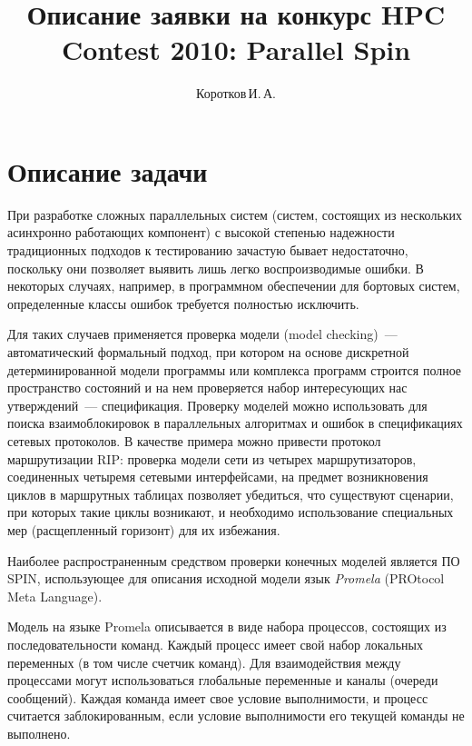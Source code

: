 \documentclass[12pt,a4paper,fleqn]{article}
\title{Описание заявки на конкурс HPC Contest 2010: Parallel Spin}
\author{Коротков\,И.\,А.}
\begin{document}

\section{Описание задачи}

При разработке сложных параллельных систем (систем, состоящих из нескольких асинхронно
работающих компонент) с высокой степенью надежности традиционных подходов к тестированию
зачастую бывает недостаточно, поскольку они позволяет выявить лишь легко воспроизводимые
ошибки. В некоторых случаях, например, в программном обеспечении для бортовых систем,
определенные классы ошибок требуется полностью исключить.

Для таких случаев применяется проверка модели (model checking)~--- автоматический
формальный подход, при котором на основе дискретной детерминированной модели программы или
комплекса программ строится полное пространство состояний и на нем проверяется набор
интересующих нас утверждений~--- спецификация. Проверку моделей можно использовать для
поиска взаимоблокировок в параллельных алгоритмах и ошибок в спецификациях сетевых
протоколов. В качестве примера можно привести протокол маршрутизации RIP: проверка модели
сети из четырех маршрутизаторов, соединенных четыремя сетевыми интерфейсами, на предмет
возникновения циклов в маршрутных таблицах позволяет убедиться, что существуют сценарии,
при которых такие циклы возникают, и необходимо использование специальных мер
(расщепленный горизонт) для их избежания.

Наиболее распространенным средством проверки конечных моделей является ПО SPIN,
использующее для описания исходной модели язык \emph{Promela} (PROtocol Meta Language).

Модель на языке Promela описывается в виде набора процессов, состоящих из последовательности
команд. Каждый процесс имеет свой набор локальных переменных (в том числе счетчик команд). Для
взаимодействия между процессами могут использоваться глобальные переменные и каналы (очереди
сообщений). Каждая команда имеет свое условие выполнимости, и процесс считается заблокированным,
если условие выполнимости его текущей команды не выполнено.
\end{document}
